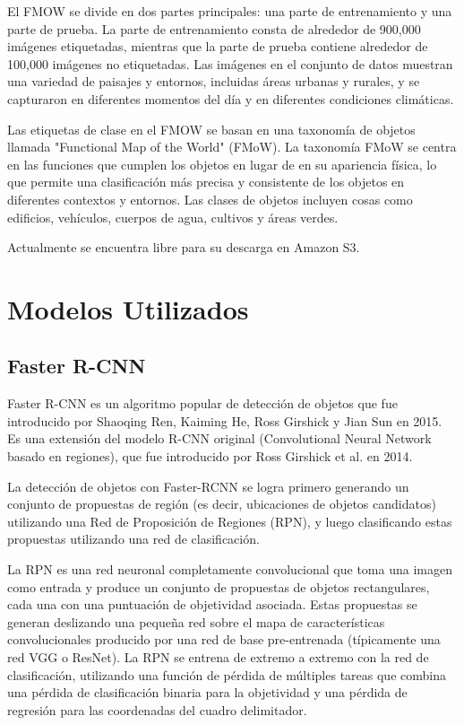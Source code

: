 \documentclass[article]{llncs}
\begin{document}
El FMOW se divide en dos partes principales: una parte de entrenamiento y una parte de prueba. La parte de entrenamiento 
consta de alrededor de 900,000 imágenes etiquetadas, mientras que la parte de prueba contiene alrededor de 100,000 
imágenes no etiquetadas. Las imágenes en el conjunto de datos muestran una variedad de paisajes y entornos, incluidas 
áreas urbanas y rurales, y se capturaron en diferentes momentos del día y en diferentes condiciones climáticas.

Las etiquetas de clase en el FMOW se basan en una taxonomía de objetos llamada "Functional Map of the World" (FMoW). La 
taxonomía FMoW se centra en las funciones que cumplen los objetos en lugar de en su apariencia física, lo que permite 
una clasificación más precisa y consistente de los objetos en diferentes contextos y entornos. Las clases de objetos 
incluyen cosas como edificios, vehículos, cuerpos de agua, cultivos y áreas verdes.

Actualmente se encuentra libre para su descarga en Amazon S3.

\section{Modelos Utilizados}

\subsection{Faster R-CNN}
Faster R-CNN es un algoritmo popular de detección de objetos que fue introducido por Shaoqing Ren, 
Kaiming He, Ross Girshick y Jian Sun en 2015. Es una extensión del modelo R-CNN original (Convolutional Neural 
Network basado en regiones), que fue introducido por Ross Girshick et al. en 2014.

La detección de objetos con Faster-RCNN se logra primero generando un conjunto de propuestas de región 
(es decir, ubicaciones de objetos candidatos) utilizando una Red de Proposición de Regiones (RPN), y luego 
clasificando estas propuestas utilizando una red de clasificación.

La RPN es una red neuronal completamente convolucional que toma una imagen como entrada y produce un conjunto de 
propuestas de objetos rectangulares, cada una con una puntuación de objetividad asociada. Estas propuestas se generan 
deslizando una pequeña red sobre el mapa de características convolucionales producido por una red de base pre-entrenada 
(típicamente una red VGG o ResNet). La RPN se entrena de extremo a extremo con la red de clasificación, utilizando una 
función de pérdida de múltiples tareas que combina una pérdida de clasificación binaria para la objetividad y una 
pérdida de regresión para las coordenadas del cuadro delimitador.
\end{document}
